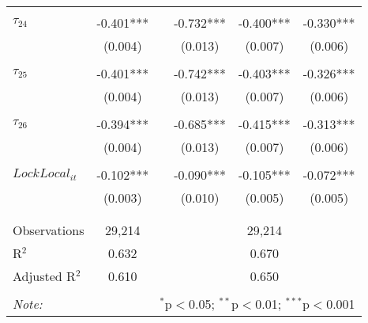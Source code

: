 \begin{tabular}{@{\extracolsep{-0pt}}lccccc}
                &           &&           &           &           \\[-2.1ex]
$\tau_{24}$     & -0.401*** && -0.732*** & -0.400*** & -0.330*** \\
                &  (0.004)  &&  (0.013)  &  (0.007)  &  (0.006)  \\
                &           &&           &           &           \\[-2.1ex]
$\tau_{25}$     & -0.401*** && -0.742*** & -0.403*** & -0.326*** \\
                &  (0.004)  &&  (0.013)  &  (0.007)  &  (0.006)  \\
                &           &&           &           &           \\[-2.1ex]
$\tau_{26}$     & -0.394*** && -0.685*** & -0.415*** & -0.313*** \\
                &  (0.004)  &&  (0.013)  &  (0.007)  &  (0.006)  \\
                &           &&           &           &           \\[-1.ex]
$LockLocal_{it}$ & -0.102*** && -0.090*** & -0.105*** & -0.072*** \\
                &  (0.003)  &&  (0.010)  &  (0.005)  &  (0.005)  \\
                &           &&           &           &           \\[-2.1ex]

\hline \\[-1.8ex] 
Observations     & 29,214 && \multicolumn{3}{c}{29,214} \\ 
R$^{2}$          &  0.632 && \multicolumn{3}{c}{0.670 } \\ 
Adjusted R$^{2}$ &  0.610 && \multicolumn{3}{c}{0.650 } \\ 
\hline 
\hline \\[-1.8ex] 
\textit{Note:}  & \multicolumn{5}{r}{$^{*}$p$<$0.05; $^{**}$p$<$0.01; $^{***}$p$<$0.001} \\ 
\end{tabular} 